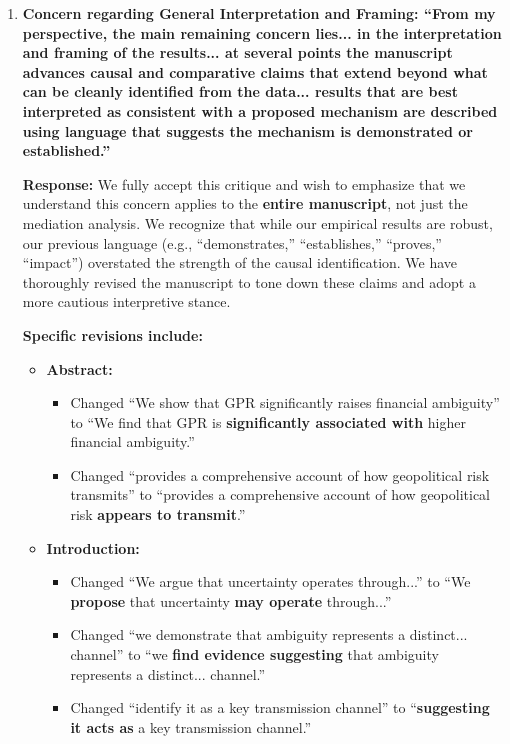 \documentclass[12pt]{article}
\begin{document}
\begin{enumerate}
    \item \textbf{Concern regarding General Interpretation and Framing: ``From my perspective, the main remaining concern lies... in the interpretation and framing of the results... at several points the manuscript advances causal and comparative claims that extend beyond what can be cleanly identified from the data... results that are best interpreted as consistent with a proposed mechanism are described using language that suggests the mechanism is demonstrated or established.''}
    
    \begin{responsebox}
    \vspace{0.5cm}
    \textbf{Response:} We fully accept this critique and wish to emphasize that we understand this concern applies to the \textbf{entire manuscript}, not just the mediation analysis. We recognize that while our empirical results are robust, our previous language (e.g., ``demonstrates,'' ``establishes,'' ``proves,'' ``impact'') overstated the strength of the causal identification. We have thoroughly revised the manuscript to tone down these claims and adopt a more cautious interpretive stance.
    
    \textbf{Specific revisions include:}
    \begin{itemize}
        \item \textbf{Abstract:} 
        \begin{itemize}
            \item Changed ``We show that GPR significantly raises financial ambiguity'' to ``We find that GPR is \textbf{significantly associated with} higher financial ambiguity.''
            \item Changed ``provides a comprehensive account of how geopolitical risk transmits'' to ``provides a comprehensive account of how geopolitical risk \textbf{appears to transmit}.''
        \end{itemize}
        
        \item \textbf{Introduction:}
        \begin{itemize}
            \item Changed ``We argue that uncertainty operates through...'' to ``We \textbf{propose} that uncertainty \textbf{may operate} through...''
            \item Changed ``we demonstrate that ambiguity represents a distinct... channel'' to ``we \textbf{find evidence suggesting} that ambiguity represents a distinct... channel.''
            \item Changed ``identify it as a key transmission channel'' to ``\textbf{suggesting it acts as} a key transmission channel.''
        \end{itemize}
        

\end{itemize}
\end{responsebox}
\end{enumerate}
\end{document}
